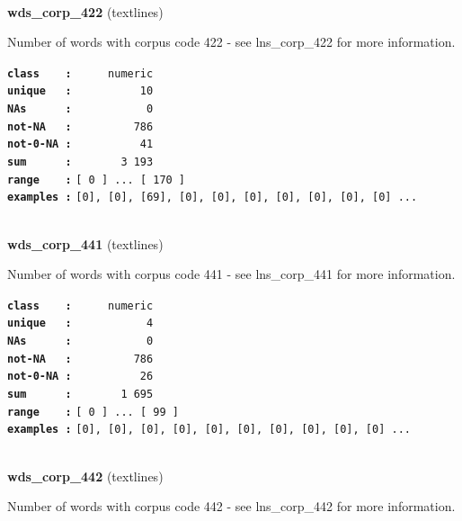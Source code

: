 \documentclass[]{article}
\begin{document}
~

\textbf{wds\_corp\_422} (textlines)

Number of words with corpus code 422 - see lns\_corp\_422 for more
information.

\textbf{\texttt{class\ \ \ \ :}} \texttt{~~~~~numeric}\\
\textbf{\texttt{unique\ \ \ :}} \texttt{~~~~~~~~~~10}\\
\textbf{\texttt{NAs\ \ \ \ \ \ :}} \texttt{~~~~~~~~~~~0}\\
\textbf{\texttt{not-NA\ \ \ :}} \texttt{~~~~~~~~~786}\\
\textbf{\texttt{not-0-NA\ :}} \texttt{~~~~~~~~~~41}\\
\textbf{\texttt{sum\ \ \ \ \ \ :}} \texttt{~~~~~~~3~193}\\
\textbf{\texttt{range\ \ \ \ :}}
\texttt{{[}\ 0\ {]}\ ...\ {[}\ 170\ {]}}\\
\textbf{\texttt{examples\ :}}
\texttt{{[}0{]},\ {[}0{]},\ {[}69{]},\ {[}0{]},\ {[}0{]},\ {[}0{]},\ {[}0{]},\ {[}0{]},\ {[}0{]},\ {[}0{]}\ ...}\\

~

\textbf{wds\_corp\_441} (textlines)

Number of words with corpus code 441 - see lns\_corp\_441 for more
information.

\textbf{\texttt{class\ \ \ \ :}} \texttt{~~~~~numeric}\\
\textbf{\texttt{unique\ \ \ :}} \texttt{~~~~~~~~~~~4}\\
\textbf{\texttt{NAs\ \ \ \ \ \ :}} \texttt{~~~~~~~~~~~0}\\
\textbf{\texttt{not-NA\ \ \ :}} \texttt{~~~~~~~~~786}\\
\textbf{\texttt{not-0-NA\ :}} \texttt{~~~~~~~~~~26}\\
\textbf{\texttt{sum\ \ \ \ \ \ :}} \texttt{~~~~~~~1~695}\\
\textbf{\texttt{range\ \ \ \ :}}
\texttt{{[}\ 0\ {]}\ ...\ {[}\ 99\ {]}}\\
\textbf{\texttt{examples\ :}}
\texttt{{[}0{]},\ {[}0{]},\ {[}0{]},\ {[}0{]},\ {[}0{]},\ {[}0{]},\ {[}0{]},\ {[}0{]},\ {[}0{]},\ {[}0{]}\ ...}\\

~

\textbf{wds\_corp\_442} (textlines)

Number of words with corpus code 442 - see lns\_corp\_442 for more
information.
\end{document}
